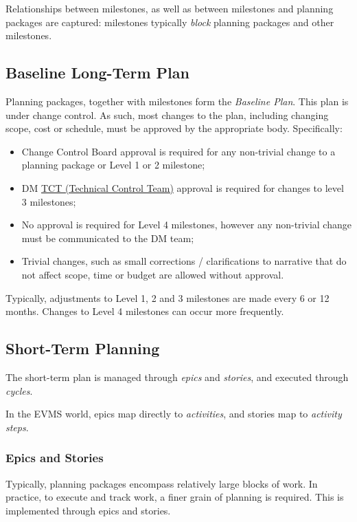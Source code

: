 \documentclass[DM,toc]{lsstdoc}
\newcommand{\sphinxstyleemphasis}{\emph}
\begin{document}
Relationships between milestones, as well as between milestones and planning packages are captured:
milestones typically \sphinxstyleemphasis{block} planning packages and other milestones.


\subsection{Baseline Long-Term Plan}
\label{\detokenize{index:baseline-long-term-plan}}
Planning packages, together with milestones form the \sphinxstyleemphasis{Baseline Plan}.
This plan is under change control.
As such, most changes to the plan, including changing scope, cost or schedule, must be approved by the appropriate body.
Specifically:
\begin{itemize}
\item {}
Change Control Board approval is required for any non-trivial change to a planning package or Level 1 or 2 milestone;

\item {}
DM \href{https://confluence.lsstcorp.org/display/DM/Technical+Control+Team}{TCT (Technical Control Team)} approval is required for changes to level 3 milestones;

\item {}
No approval is required for Level 4 milestones, however any non-trivial change must be communicated to the DM team;

\item {}
Trivial changes, such as small corrections / clarifications to narrative that do not affect scope, time or budget are allowed without approval.

\end{itemize}

Typically, adjustments to Level 1, 2 and 3 milestones are made every 6 or 12 months. Changes to Level 4
milestones can occur more frequently.


\subsection{Short-Term Planning}
\label{\detokenize{index:short-term-planning}}
The short-term plan is managed through \sphinxstyleemphasis{epics} and \sphinxstyleemphasis{stories}, and executed through \sphinxstyleemphasis{cycles}.

In the EVMS world, epics map directly to \sphinxstyleemphasis{activities}, and stories map to \sphinxstyleemphasis{activity steps}.


\subsubsection{Epics and Stories}
\label{\detokenize{index:epics-and-stories}}
Typically, planning packages encompass relatively large blocks of work.  In practice, to execute and track
work, a finer grain of planning is required. This is implemented through epics and stories.
\end{document}
